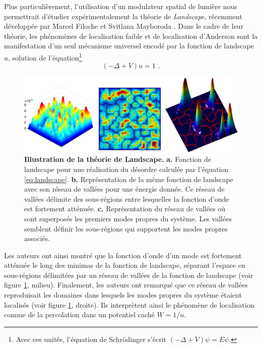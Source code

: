 Plus particulièrement, l'utilisation d'un modulateur spatial de lumière nous permettrait d'étudier expérimentalement la théorie de \emph{Landscape}, récemment développée par Marcel Filoche et Svitlana Mayboroda \citep{filoche2012universal}. Dans le cadre de leur théorie, les phénomènes de localisation faible et de localisation d'Anderson sont la manifestation d'un seul mécanisme universel encodé par la fonction de landscape $u$, solution de l'équation\footnote{Avec ces unités, l'équation de Schrödinger s'écrit $(-\Delta+V)\psi=E\psi$.}
\begin{equation}
(-\Delta+V)u=1 \text{ .}
\label{eq:landscape}
\end{equation}

\begin{figure}
\centering
\includegraphics[width=\textwidth]{Fig/Conclusion/landscape.pdf}
\caption{\textbf{Illustration de la théorie de Landscape.} \textbf{a.} Fonction de landscape pour une réalisation du désordre calculée par l'équation \ref{eq:landscape}. \textbf{b.} Représentation de la même fonction de landscape avec son réseau de vallées pour une énergie donnée. Ce réseau de vallées délimite des sous-régions entre lesquelles la fonction d'onde est fortement atténuée. \textbf{c.} Représentation du réseau de vallées où sont superposés les premiers modes propres du système. Les vallées semblent définir les sous-régions qui supportent les modes propres associés.}
\label{fig:landscape}
\end{figure}

Les auteurs ont ainsi montré que la fonction d'onde d'un mode est fortement atténuée le long des minimas de la fonction de landscape, séparant l'espace en sous-régions délimitées par un réseau de vallées de la fonction de landscape (voir figure \ref{fig:landscape}, milieu). Finalement, les auteurs ont remarqué que ce réseau de vallées reproduisait les domaines dans lesquels les modes propres du système étaient localisés (voir figure \ref{fig:landscape}, droite). Ils interprètent ainsi le phénomène de localisation comme de la percolation dans un potentiel caché $W=1/u$.

